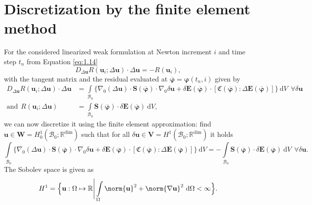 \section{Discretization by the finite element method}
For the considered linearized weak formulation at Newton increment $i$ and time step $t_n$ from Equation \eqref{eq:1.14}
\begin{equation}
D_{\Delta \mathbf{u}} R(\mathbf{u}_i; \Delta \mathbf{u}) \cdot \Delta\mathbf{u} = -R(\mathbf{u}_{i}) ,
\label{eq:1.24}
\end{equation}
with the tangent matrix and the residual evaluated at $\overline{\bm{\varphi}} = \bm{\varphi}(t_n,i)$ given by
\begin{align*}
D_{\Delta\mathbf{u}} R(\mathbf{u}_i; \Delta \mathbf{u}) \cdot \Delta\mathbf{u} &= \int\limits_{\mathcal{B}_0} \Big\lbrace \nabla_0 (\Delta\mathbf{u}) \cdot \mathbf{S}(\overline{\bm{\varphi}}) \cdot \nabla_0 \delta\mathbf{u} + \delta \mathbf{E}(\overline{\bm{\varphi}}) \cdot \left[ \mathfrak{C}(\overline{\bm{\varphi}}) : \Delta\mathbf{E}(\overline{\bm{\varphi}}) \right] \Big\rbrace \ \mathrm{d}V \ \ \forall \delta\mathbf{u} \\
\text{and} \ \ R(\mathbf{u}_i; \Delta \mathbf{u}) &= \int\limits_{\mathcal{B}_0} \mathbf{S}(\overline{\bm{\varphi}}) \cdot \delta \mathbf{E}(\overline{\bm{\varphi}}) \ \mathrm{d}V,
\end{align*}
we can now discretize it using the finite element approximation: find $\mathbf{u} \in \mathbf{W} = H^1_0 (\mathcal{B}_0; \mathbb{R}^{\text{dim}})$ such that for all $\delta\mathbf{u} \in \mathbf{V} = H^1 (\mathcal{B}_0; \mathbb{R}^{\text{dim}})$ it holds
\begin{equation}
\int\limits_{\mathcal{B}_0} \Big\lbrace \nabla_0 (\Delta\mathbf{u}) \cdot \mathbf{S}(\overline{\bm{\varphi}}) \cdot \nabla_0 \delta\mathbf{u} + \delta \mathbf{E}(\overline{\bm{\varphi}}) \cdot \left[ \mathfrak{C}(\overline{\bm{\varphi}}) : \Delta\mathbf{E}(\overline{\bm{\varphi}}) \right] \Big\rbrace \ \mathrm{d}V = -\int\limits_{\mathcal{B}_0} \mathbf{S}(\overline{\bm{\varphi}}) \cdot \delta \mathbf{E}(\overline{\bm{\varphi}}) \ \mathrm{d}V \ \ \forall \delta\mathbf{u}.
\label{eq:1.23}
\end{equation}
The Sobolev space is given as 
\begin{equation}
H^1 = \Big\lbrace \mathbf{u}: \Omega \mapsto \mathbb{R} \Bigg| \int\limits_{\Omega} \norm{\mathbf{u}}^2 + \norm{\nabla \mathbf{u}}^2 \ \mathrm{d}\Omega < \infty \Big\rbrace.
\end{equation}
